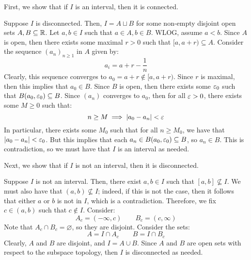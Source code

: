 \documentclass{article}
\begin{document}
\begin{soln}
    First, we show that if $ I $ is an interval, then it is connected. \npgh
    
    Suppose $ I $ is disconnected. Then, $ I = A \sqcup B $ for some
    non-empty disjoint open sets $ A, B \subseteq \mathbb{R} $.
    Let $ a, b \in I $ such that $ a \in A, b \in B $. WLOG, assume $ a < b $. \vsp
    Since $ A $ is open, then there exists some maximal $ r > 0 $ such that
    $ [a, a + r) \subseteq A $.
    Consider the sequence $ (a_{n})_{n\geq1} $ in $ A $ given by:
    \begin{equation*}
        a_{i} = a + r - \frac{1}{n}
    \end{equation*}
    Clearly, this sequence converges to $ a_{0} = a + r \notin [a, a+r) $.
    Since $ r $ is maximal, then this implies that $ a_{0} \in B $. \vsp
    Since $ B $ is open, then there exists some $ \operatorname{\varepsilon}_{0} $ such that
    $ B(a_{0}, \operatorname{\varepsilon}_{0}) \subseteq B $.
    Since $ (a_{n}) $ converges to $ a_{0} $, then for all $ \operatorname{\varepsilon} > 0 $,
    there exists some $ M \geq 0 $ such that:
    \begin{equation*}
        n \geq M \implies \abs{a_{0} - a_{n}} < \operatorname{\varepsilon}
    \end{equation*}
    In particular, there exists some $ M_{0} $ such that for all $ n \geq M_{0} $,
    we have that $ \abs{a_{0} - a_{n}} < \operatorname{\varepsilon}_{0} $.
    But this implies that each $ a_{n} \in B(a_{0}, \operatorname{\varepsilon}_{0}) \subseteq B $, so $ a_{n} \in B $.
    This is contradiction, so we must have that $ I $ is an interval as needed. \npgh

    Next, we show that if $ I $ is not an interval, then it is disconnected. \npgh

    Suppose $ I $ is not an interval.
    Then, there exist $ a, b \in I $ such that $ [a, b] \nsubseteq I $.
    We must also have that $ (a, b) \nsubseteq I $; indeed, if this is not the case,
    then it follows that either $ a $ or $ b $ is not in $ I $, which is a contradiction.
    Therefore, we fix $ c \in (a, b) $ such that $ c \notin I $. Consider:
    \begin{equation*}
        A_{c} = (-\infty, c) \qquad B_{c} = (c, \infty)
    \end{equation*}
    Note that $ A_{c} \cap B_{c} = \varnothing $, so they are disjoint. Consider the sets:
    \begin{equation*}
        A = I \cap A_{c} \qquad B = I \cap B_{c}
    \end{equation*}
    Clearly, $ A $ and $ B $ are disjoint, and $ I = A \cup B $.
    Since $ A $ and $ B $ are open sets with respect to the subspace topology,
    then $ I $ is disconnected as needed.
\end{soln}
\end{document}
